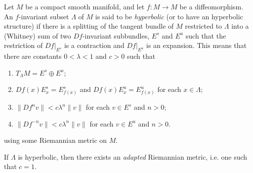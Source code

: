 \documentclass[12pt]{article}
\newcommand{\Cdiff}{\mathcal{C}}
\begin{document}
Let $M$ be a compact smooth manifold, and let $f:M\to M$ be a diffeomorphism.
An $f$-invariant subset $\Lambda$ of $M$ is said to be \emph{hyperbolic} (or to have an hyperbolic structure) if there is a splitting of the tangent bundle of $M$ restricted to $\Lambda$ into a (Whitney) sum of two $Df$-invariant subbundles, $E^s$ and $E^u$ such that the restriction of $Df|_{E^s}$ is a contraction and $Df|_{E^u}$ is an expansion. This means that there are constants $0<\lambda<1$ and $c>0$ such that
\begin{enumerate}
\item $T_\Lambda M = E^s\oplus E^u$;
\item $Df(x)E^s_x = E^s_{f(x)}$ and $Df(x)E^u_x = E^u_{f(x)}$ for each $x\in \Lambda$;
\item $\|Df^nv\| < c\lambda^n\|v\|$ for each $v\in E^s$ and $n> 0$;
\item $\|Df^{-n}v\| < c\lambda^n \|v\|$ for each $v\in E^u$ and $n>0$.
\end{enumerate}
using some Riemannian metric on $M$.

If $\Lambda$ is hyperbolic, then there exists an \emph{adapted} Riemannian metric, i.e. one such that $c=1$.






\end{document}
